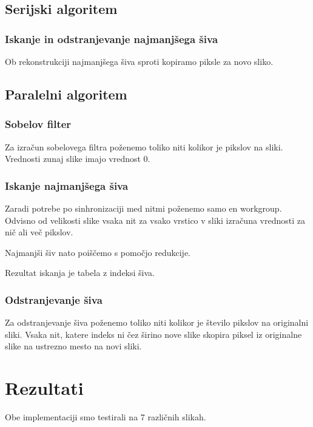 \documentclass[11pt,a4paper]{article}
\begin{document}
\subsection{Serijski algoritem}
\label{serial}
\subsubsection{Iskanje in odstranjevanje najmanjšega šiva}

Ob rekonstrukciji najmanjšega šiva sproti kopiramo piksle
za novo sliko.

\subsection{Paralelni algoritem}
\label{paralel}

\subsubsection{Sobelov filter}
Za izračun sobelovega filtra poženemo toliko niti kolikor je
pikslov na sliki. Vrednosti zunaj slike imajo vrednost 0.

\subsubsection{Iskanje najmanjšega šiva}
Zaradi potrebe po sinhronizaciji med nitmi poženemo samo en
workgroup. Odvisno od velikosti slike vsaka nit za vsako
vrstico v sliki izračuna vrednosti za nič ali več pikslov.

Najmanjši šiv nato poiščemo s pomočjo redukcije.

Rezultat iskanja je tabela z indeksi šiva.

\subsubsection{Odstranjevanje šiva}
Za odstranjevanje šiva poženemo toliko niti kolikor je število
pikslov na originalni sliki. Vsaka nit, katere indeks ni čez
širino nove slike skopira piksel iz originalne slike na
ustrezno mesto na novi sliki.

\pagebreak

\section{Rezultati}
Obe implementaciji smo testirali na 7 različnih slikah.
\end{document}

